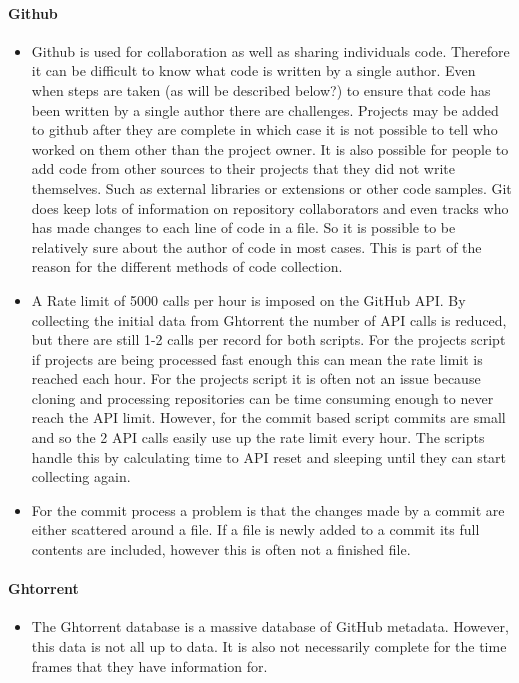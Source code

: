 \documentclass{article}
\begin{document}
\paragraph{Github}
\begin{itemize}
    \item Github is used for collaboration as well as sharing individuals code. Therefore it can be difficult to know what code is written by a single author. Even when steps are taken (as will be described below?) to ensure that code has been written by a single author there are challenges. Projects may be added to github after they are complete in which case it is not possible to tell who worked on them other than the project owner. It is also possible for people to add code from other sources to their projects that they did not write themselves. Such as external libraries or extensions or other code samples. Git does keep lots of information on repository collaborators and even tracks who has made changes to each line of code in a file. So it is possible to be relatively sure about the author of code in most cases. This is part of the reason for the different methods of code collection.

    \item A Rate limit of 5000 calls per hour is imposed on the GitHub API. By collecting the initial data from Ghtorrent the number of API calls is reduced, but there are still 1-2 calls per record for both scripts. For the projects script if projects are being processed fast enough this can mean the rate limit is reached each hour. For the projects script it is often not an issue because cloning and processing repositories can be time consuming enough to never reach the API limit. However, for the commit based script commits are small and so the 2 API calls easily use up the rate limit every hour. The scripts handle this by calculating time to API reset and sleeping until they can start collecting again.

    \item For the commit process a problem is that the changes made by a commit are either scattered around a file. If a file is newly added to a commit its full contents are included, however this is often not a finished file.
\end{itemize}

\paragraph{Ghtorrent}
\begin{itemize}
    \item The Ghtorrent database is a massive database of GitHub metadata. However, this data is not all up to data. It is also not necessarily complete for the time frames that they have information for.
\end{itemize}
\end{document}
